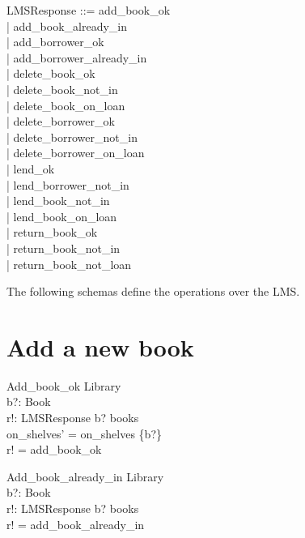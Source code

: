 \documentclass[11pt, fuzz]{article}
\begin{document}
\begin{zed}
    LMSResponse ::= add\_book\_ok               \\
                  | add\_book\_already\_in      \\
                  | add\_borrower\_ok           \\
                  | add\_borrower\_already\_in  \\
                  | delete\_book\_ok            \\
                  | delete\_book\_not\_in       \\
                  | delete\_book\_on\_loan      \\
                  | delete\_borrower\_ok        \\
                  | delete\_borrower\_not\_in   \\
                  | delete\_borrower\_on\_loan  \\
                  | lend\_ok                    \\
                  | lend\_borrower\_not\_in     \\
                  | lend\_book\_not\_in         \\
                  | lend\_book\_on\_loan        \\
                  | return\_book\_ok            \\
                  | return\_book\_not\_in       \\
                  | return\_book\_not\_loan     \\
\end{zed}


The following schemas define the operations over the LMS. 

\section{Add a new book}

\begin{schema}{Add\_book\_ok}
    \Delta Library  \\
    b?: Book        \\
    r!: LMSResponse 
\where
    b? \notin books                      \\
    on\_shelves' = on\_shelves \cup \{b?\} \\
    r! = add\_book\_ok
\end{schema}

\begin{schema}{Add\_book\_already\_in}
    \Xi Library     \\
    b?: Book        \\
    r!: LMSResponse
\where
    b? \in books                \\
    r! = add\_book\_already\_in
\end{schema}
\end{document}
